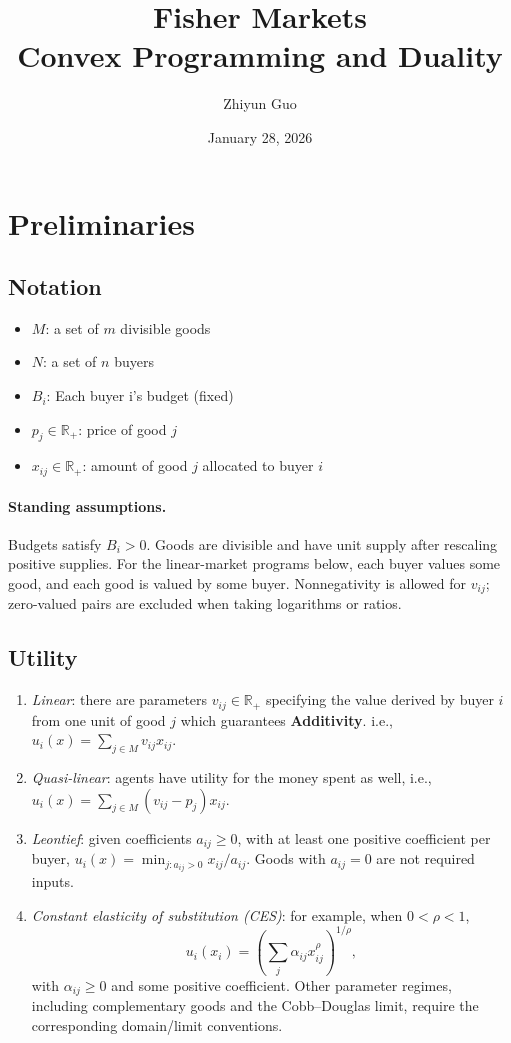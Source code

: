 \documentclass[11pt, a4paper]{article}
\title{\textbf{\Huge Fisher Markets}\\\Large Convex Programming and Duality}
\author{Zhiyun Guo}
\date{January 28, 2026}
\begin{document}
\maketitle


\section{Preliminaries}

\subsection{Notation}
\begin{itemize}
    \item $M$: a set of $m$ divisible goods
    \item $N$: a set of $n$ buyers
    \item $B_i$: Each buyer i's budget (fixed)
    \item $p_j\in \mathbb{R}_+$: price of good $j$ 
    \item $x_{ij}\in\mathbb{R}_+$: amount of good $j$ allocated to buyer $i$
\end{itemize}
\paragraph{Standing assumptions.} Budgets satisfy $B_i>0$. Goods are divisible and have unit supply after rescaling positive supplies. For the linear-market programs below, each buyer values some good, and each good is valued by some buyer. Nonnegativity is allowed for $v_{ij}$; zero-valued pairs are excluded when taking logarithms or ratios.
\subsection{Utility}
\begin{enumerate}
    \item \textit{Linear}: there are parameters $v_{ij}\in\mathbb{R}_+$ specifying the value derived by buyer $i$ from one unit of good $j$ which guarantees \textbf{Additivity}. i.e., $u_i(x)=\sum_{j\in M}v_{ij}x_{ij}$.
    \item\textit{Quasi-linear}: agents have utility for the money spent as well, i.e., $u_i(x)=\sum_{j\in M}(v_{ij}-p_j)x_{ij}$.
    \item \textit{Leontief}: given coefficients $a_{ij}\ge0$, with at least one positive coefficient per buyer, $u_i(x)=\min_{j:a_{ij}>0}x_{ij}/a_{ij}$. Goods with $a_{ij}=0$ are not required inputs.
    \item \textit{Constant elasticity of substitution (CES)}: for example, when $0<\rho<1$,
\[
u_i(x_i)=\left(\sum_j\alpha_{ij}x_{ij}^{\rho}\right)^{1/\rho},
\]
with $\alpha_{ij}\ge0$ and some positive coefficient. Other parameter regimes, including complementary goods and the Cobb--Douglas limit, require the corresponding domain/limit conventions. 
\end{enumerate}
\end{document}
